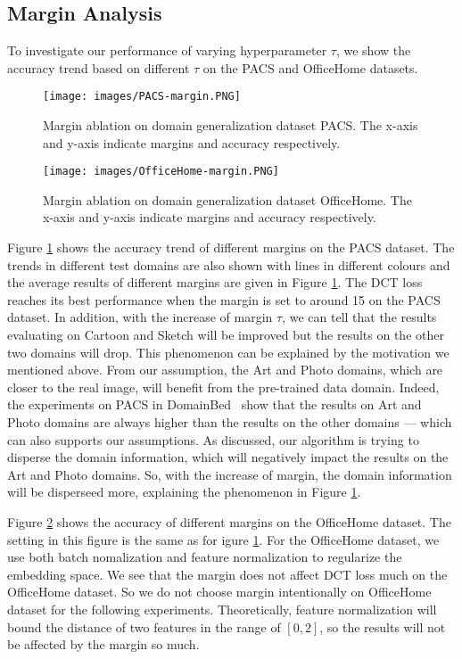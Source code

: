 \documentclass[a4paper,fleqn]{cas-dc}
\begin{document}
\subsection{Margin Analysis}
To investigate our performance of varying hyperparameter $\tau$, we show the accuracy trend based on different $\tau$ on the PACS and OfficeHome datasets. \par
\begin{figure}[ht]
\centering 
\texttt{[image: images/PACS-margin.PNG]}
\caption{Margin ablation on domain generalization dataset PACS. The x-axis and y-axis indicate margins and accuracy respectively.} 
\label{Fig3} 
\end{figure}
\begin{figure}[ht]
\centering 
\texttt{[image: images/OfficeHome-margin.PNG]} 
\caption{Margin ablation on domain generalization dataset OfficeHome. The x-axis and y-axis indicate margins and accuracy respectively.} 
\label{FigOHmargin} 
\end{figure}
Figure \ref{Fig3} shows the accuracy trend of different margins on the PACS dataset. The trends in different test domains are also shown with lines in different colours and the average results of different margins are given in Figure \ref{Fig3}. The DCT loss reaches its best performance when the margin is set to around 15 on the PACS dataset. In addition, with the increase of margin $\tau$, we can tell that the results evaluating on Cartoon and Sketch will be improved but the results on the other two domains will drop. This phenomenon can be explained by the motivation we mentioned above. From our assumption,  the Art and Photo domains, which are closer to the real image, will benefit from the pre-trained data domain. Indeed, the experiments on PACS in DomainBed~\cite{domainbed} show that the results on Art and Photo domains are always higher than the results on the other domains --- which can also supports our assumptions. As discussed, our algorithm is trying to disperse the domain information, which will negatively impact the results on the Art and Photo domains. So, with the increase of margin, the domain information will be disperseed more, explaining the phenomenon in Figure \ref{Fig3}.\par
Figure \ref{FigOHmargin} shows the accuracy of different margins on the OfficeHome dataset. The setting in this figure is the same as for igure \ref{Fig3}. For the OfficeHome dataset, we use both batch nomalization and feature normalization to regularize the embedding space.  We see that the margin does not affect DCT loss much on the OfficeHome dataset. So we do not choose margin intentionally on OfficeHome dataset for the following experiments. Theoretically, feature normalization will bound the distance of two features in the range of $[0,2]$, so the results will not be affected by the margin so much.  
\end{document}
